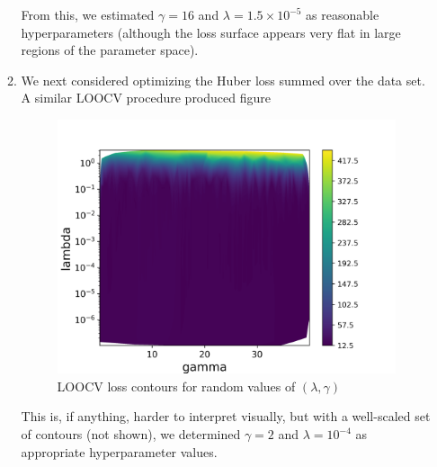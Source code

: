 \documentclass[11pt,letterpaper]{article}
\theoremstyle{definition}
\theoremstyle{plain}
\numberwithin{equation}{section}
\numberwithin{figure}{section}
\begin{document}
\begin{enumerate}
\begin{enumerate}
		From this, we estimated $\gamma=16$ and $\lambda = 1.5\times 10^{-5}$ as reasonable hyperparameters (although the loss surface appears very flat in large regions of the parameter space).


		\item We next considered optimizing the Huber loss summed over the data set. A similar LOOCV procedure produced figure
		\begin{figure}[H]
			\centering
			\includegraphics[width=.6\textwidth]{figures/2b_loocv.png}
			\caption{LOOCV loss contours for random values of $(\lambda,\gamma)$}
			\label{fig:2b_loocv}
		\end{figure}
		This is, if anything, harder to interpret visually, but with a well-scaled set of contours (not shown), we determined $\gamma =2$ and $\lambda = 10^{-4}$ as appropriate hyperparameter values.
	\end{enumerate}

\end{enumerate}
\end{document}
